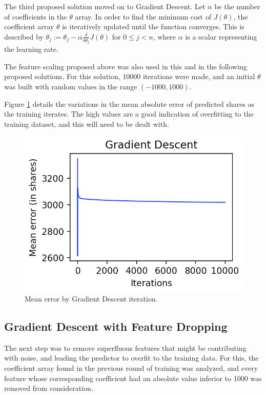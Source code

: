 \documentclass[10pt,twocolumn,letterpaper]{article}
\begin{document}
The third proposed solution moved on to Gradient Descent. Let $n$ be the number of coefficients in the $\theta$ array. In order to find the minimum cost of $J(\theta)$, the coefficient array $\theta$ is iteratively updated until the function converges. This is described by $\theta_j := \theta_j - \alpha\frac{\delta}{\delta\theta_j}J(\theta)$ for $0 \leq j < n$, where $\alpha$ is a scalar representing the learning rate.

The feature scaling proposed above was also used in this and in the following proposed solutions. For this solution, 10000 iterations were made, and an initial $\theta$ was built with random values in the range $(-1000,1000)$. 

Figure \ref{fig:gd1} details the variations in the mean absolute error of predicted shares as the training iterates. The high values are a good indication of overfitting to the training dataset, and this will need to be dealt with.

\begin{figure}
\begin{center}
	\includegraphics[width=0.99\columnwidth]{pics/gd1.png}
	\caption{Mean error by Gradient Descent iteration.\label{fig:gd1}}   
\end{center} 
\end{figure} 

\subsection{Gradient Descent with Feature Dropping}
\label{sec:gdfd}

The next step was to remove superfluous features that might be contributing with noise, and leading the predictor to overfit to the training data. For this, the coefficient array found in the previous round of training was analyzed, and every feature whose corresponding coefficient had an absolute value inferior to 1000 was removed from consideration.
\end{document}
